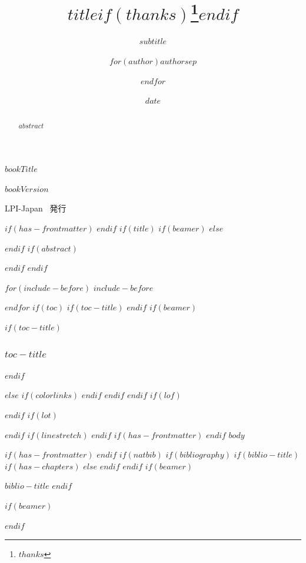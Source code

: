 \documentclass[
$if(fontsize)$
  $fontsize$,
$endif$
$if(papersize)$
  $papersize$paper,
$endif$
$if(beamer)$
  ignorenonframetext,
$if(handout)$
  handout,
$endif$
$if(aspectratio)$
  aspectratio=$aspectratio$,
$endif$
$endif$
$for(classoption)$
  $classoption$$sep$,
$endfor$
]{$documentclass$}
\title{$title$$if(thanks)$\thanks{$thanks$}$endif$}
\subtitle{$subtitle$}
\author{$for(author)$$author$$sep$ \and $endfor$}
\date{$date$}
\institute{$for(institute)$$institute$$sep$ \and $endfor$}
\newif\ifbibliography
\begin{document}
\thispagestyle{empty}
\null
\cleardoublepage

\thispagestyle{empty}
\begin{center}
  \vspace*{6cm}
  {\Huge $bookTitle$}

  \vfill

  {\Large $bookVersion$}

  {\Large LPI-Japan \, 発行}

  \vspace*{4cm}
\end{center}
\newpage

$if(has-frontmatter)$
\frontmatter
$endif$
$if(title)$
$if(beamer)$
\frame{\titlepage}
$else$
\maketitle
$endif$
$if(abstract)$
\begin{abstract}
$abstract$
\end{abstract}
$endif$
$endif$


$for(include-before)$
$include-before$

$endfor$
\newpage
$if(toc)$
$if(toc-title)$
\renewcommand*\contentsname{$toc-title$}
$endif$
$if(beamer)$
\begin{frame}[allowframebreaks]
$if(toc-title)$
  \frametitle{$toc-title$}
$endif$
  \tableofcontents[hideallsubsections]
\end{frame}
$else$
{
$if(colorlinks)$
\hypersetup{linkcolor=$if(toccolor)$$toccolor$$else$$endif$}
$endif$
\setcounter{tocdepth}{$toc-depth$}
\tableofcontents
\newpage
}
$endif$
$endif$
$if(lof)$
\listoffigures
$endif$
$if(lot)$
\listoftables
$endif$
$if(linestretch)$
$endif$
$if(has-frontmatter)$
\mainmatter
$endif$
$body$

$if(has-frontmatter)$
\backmatter
$endif$
$if(natbib)$
$if(bibliography)$
$if(biblio-title)$
$if(has-chapters)$
\renewcommand\bibname{$biblio-title$}
$else$
\renewcommand\refname{$biblio-title$}
$endif$
$endif$
$if(beamer)$
\begin{frame}[allowframebreaks]{$biblio-title$}
  \bibliographytrue
$endif$
  
$if(beamer)$
\end{frame}
$endif$
\end{document}
